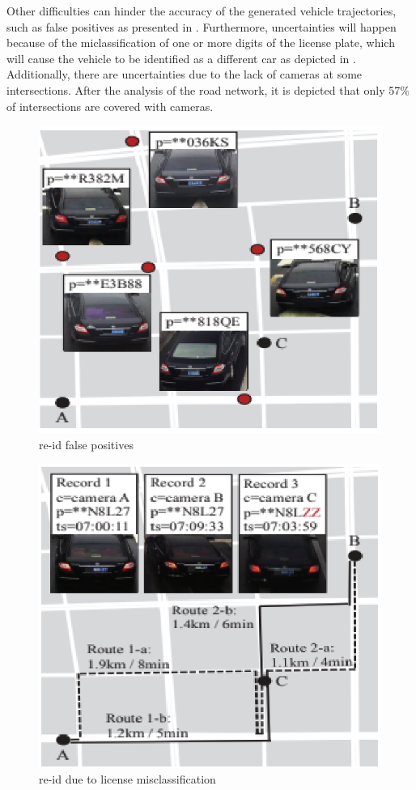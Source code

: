 Other difficulties can hinder the accuracy of the generated vehicle trajectories, such as false positives as presented in .
Furthermore, uncertainties will happen because of the miclassification of one or more digits of the license plate, which will cause the vehicle to be identified as a different car as depicted in .
Additionally, there are uncertainties due to the lack of cameras at some intersections.
After the analysis of the road network, it is depicted that only 57\% of intersections are covered with cameras.

\begin{figure}
\centering
  \includegraphics[width=0.5\linewidth]{figures/false-positives.eps}
  \caption{\ac{re-id} false positives \cite{tong2021large}}
  \label{fig:false-positives}
\end{figure}

\begin{figure}
\centering
  \includegraphics[width=0.5\linewidth]{figures/license-misclassification.eps}
  \caption{\ac{re-id} due to license misclassification \cite{tong2021large}}
  \label{fig:license-misclassification}
\end{figure}
